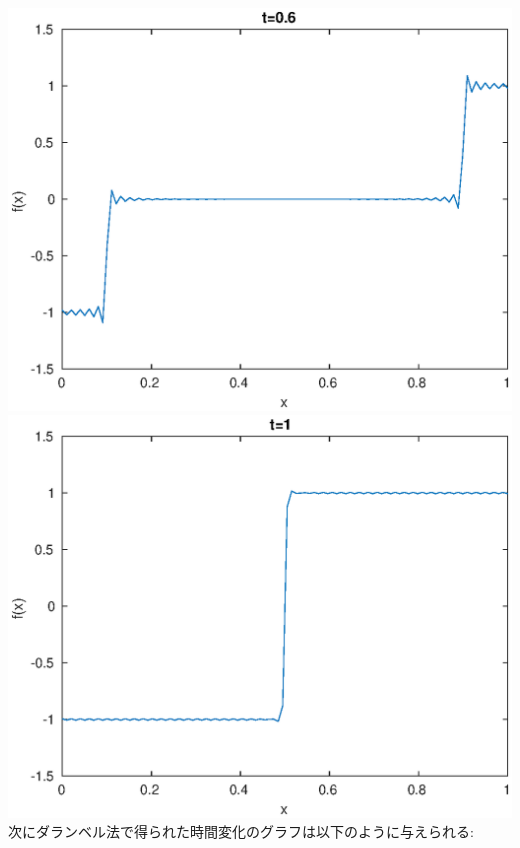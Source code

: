 \documentclass{jreport}
\begin{document}
\includegraphics[scale=0.3]{t6.eps}
\includegraphics[scale=0.3]{t1.eps}\\
次にダランベル法で得られた時間変化のグラフは以下のように与えられる:\\
\end{document}
